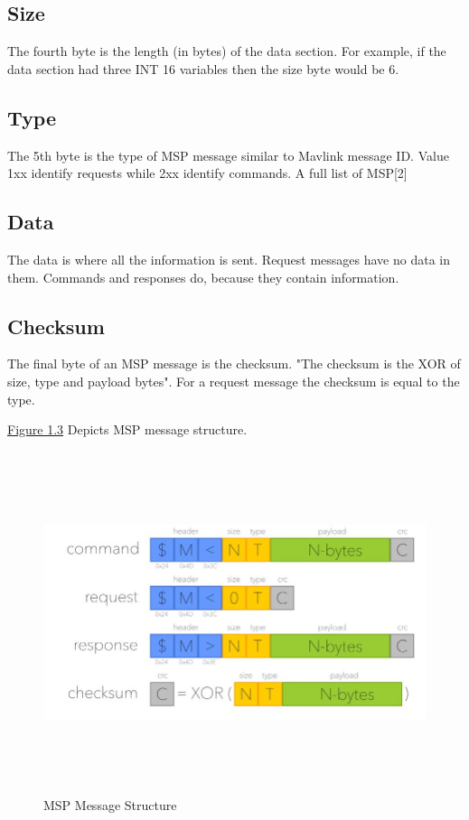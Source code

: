\subsection{Size}
The fourth byte is the length (in bytes) of the data section. For example, if the data section had three INT 16 variables then the size byte would be 6.

\subsection{Type}
The 5th byte is the type of MSP message similar to Mavlink message ID. Value 1xx identify requests while 2xx identify commands.
A full list of MSP[2]

\subsection{Data}
The data is where all the information is sent. Request messages have no data in them. Commands and responses do, because they contain information.

\subsection{Checksum}
The final byte of an MSP message is the checksum. "The checksum is the XOR of size, type and payload bytes". For a request message the checksum is equal to the type.

\hyperref[fig:msp]{Figure 1.3} Depicts MSP message structure. 
 \begin{figure}[H]
\includegraphics[width=15cm,height=10cm]{images/3.jpg}
\caption{MSP Message Structure }
\label{fig:msp}
\end{figure}



